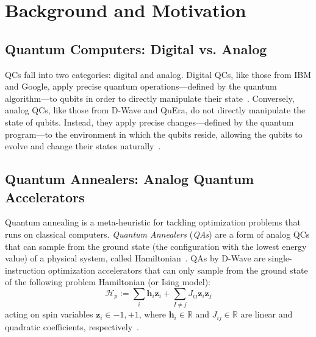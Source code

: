 \clearpage

\section{Background and Motivation}


\subsection{Quantum Computers: Digital vs. Analog}


QCs fall into two categories: digital and analog. 
Digital QCs, like those from IBM and Google, apply precise quantum operations---defined by the quantum algorithm---to qubits in order to directly manipulate their state~\cite{nielsen2010quantum}. 
Conversely, analog QCs, like those from D-Wave and QuEra, do not directly manipulate the state of qubits. 
Instead, they apply precise changes---defined by the quantum program---to the environment in which the qubits reside, allowing the qubits to evolve and change their states naturally~\cite{albash2018adiabatic,ayanzadeh2022equal}.
 


\subsection{Quantum Annealers: Analog Quantum Accelerators}

Quantum annealing is a meta-heuristic for tackling optimization problems that runs on classical computers. 
\emph{Quantum Annealers} (\emph{QAs}) are a form of analog QCs that can sample from the ground state (the configuration with the lowest energy value) of a physical system, called Hamiltonian~\cite{albash2018adiabatic,ayanzadeh2021multi,ayanzadeh2022equal}. 
QAs by D-Wave are single-instruction optimization accelerators that can only sample from the ground state of the following problem Hamiltonian (or Ising model): 
\begin{equation}
    \mathcal{H}_p := \sum_{i}{\mathbf{h}_i \mathbf{z}_i} + \sum_{I \neq j}{J_{ij}\mathbf{z}_i \mathbf{z}_j}
    \label{eq:QA_H_p}
\end{equation}
acting on spin variables $\mathbf{z}_i \in {-1, +1}$, where $\mathbf{h}_i \in \mathbb{R}$  and $J_{ij} \in \mathbb{R}$ 
are linear and quadratic coefficients, respectively~\cite{ayanzadeh2022equal}. 


